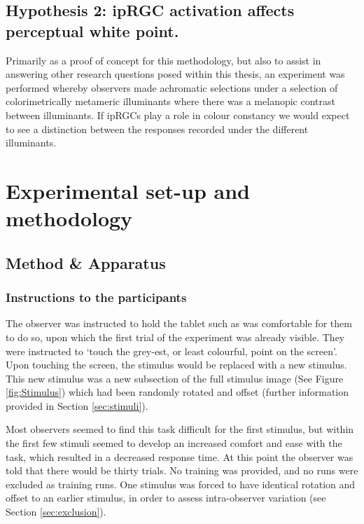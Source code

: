\subsection*{Hypothesis 2: \gls{ipRGC} activation affects perceptual white point.}
Primarily as a proof of concept for this methodology, but also to assist in answering other research questions posed within this thesis, an experiment was performed whereby observers made achromatic selections under a selection of colorimetrically metameric illuminants where there was a melanopic contrast between illuminants. %
If \gls{ipRGCs} play a role in colour constancy we would expect to see a distinction between the responses recorded under the different illuminants. 

\section{Experimental set-up and methodology}
\subsection{Method \& Apparatus}

\subsubsection{Instructions to the participants}

The observer was instructed to hold the tablet such as was comfortable for them to do so, upon which the first trial of the experiment was already visible. They were instructed to `touch the grey-est, or least colourful, point on the screen'. Upon touching the screen, the stimulus would be replaced with a new stimulus. This new stimulus was a new subsection of the full stimulus image (See Figure \ref{fig:Stimulus}) which had been randomly rotated and offset (further information provided in Section \ref{sec:stimuli}).

Most observers seemed to find this task difficult for the first stimulus, but within the first few stimuli seemed to develop an increased comfort and ease with the task, which resulted in a decreased response time. %
At this point the observer was told that there would be thirty trials. No training was provided, and no runs were excluded as training runs. One stimulus was forced to have identical rotation and offset to an earlier stimulus, in order to assess intra-observer variation (see Section \ref{sec:exclusion}).

